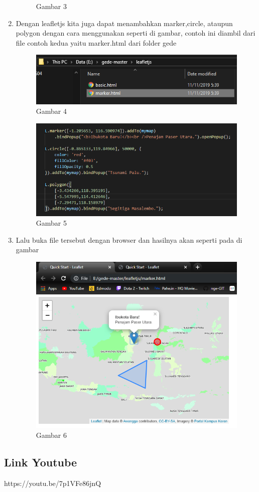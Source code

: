 \begin{enumerate}
\begin{figure}[H]
		\centering
		\caption{Gambar 3}
	\end{figure}
    \item Dengan leafletjs kita juga dapat menambahkan marker,circle, ataupun polygon dengan cara menggunakan seperti di gambar, contoh ini diambil
          dari file contoh kedua yaitu marker.html dari folder gede 
    \hfill\break
    \begin{figure}[H]
		\includegraphics[width=12cm]{figures/Tugas5/1174083/pic4.png}
		\centering
		\caption{Gambar 4}
	\end{figure}
	\begin{figure}[H]
		\includegraphics[width=12cm]{figures/Tugas5/1174083/pic5.png}
		\centering
		\caption{Gambar 5}
	\end{figure}
    \item Lalu buka file tersebut dengan browser dan hasilnya akan seperti pada di gambar
    \hfill\break
    \begin{figure}[H]
		\includegraphics[width=12cm]{figures/Tugas5/1174083/pic6.png}
		\centering
		\caption{Gambar 6}
	\end{figure}
\end{enumerate}
\subsection{Link Youtube}
https://youtu.be/7p1VFe86jnQ